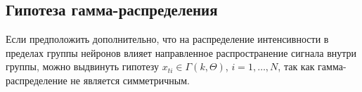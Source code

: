 \documentclass[12pt,twoside]{article}
\begin{document}
\subsection{Гипотеза гамма-распределения}
Если предположить дополнительно, что на распределение интенсивности в пределах группы нейронов влияет направленное распространение сигнала внутри группы, можно выдвинуть гипотезу $x_{ti}
\in \Gamma(k, \Theta)$, $i=1,\dots,N$, так как гамма-распределение не является симметричным.





\end{document}
